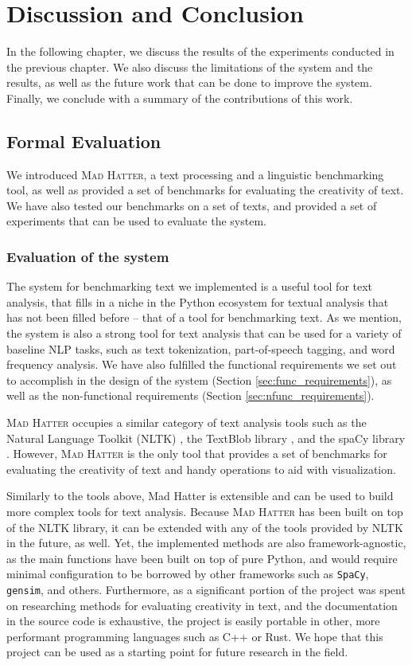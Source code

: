 \chapter{Discussion and Conclusion}
\label{chap:discussion}

In the following chapter, we discuss the results of the experiments conducted in the previous chapter. We also discuss the limitations of the system and the results, as well as the future work that can be done to improve the system. Finally, we conclude with a summary of the contributions of this work. 

\section{Formal Evaluation}
We introduced \textsc{Mad Hatter}, a text processing and a linguistic benchmarking tool, as well as provided a set of benchmarks for evaluating the creativity of text. We have also tested our benchmarks on a set of texts, and provided a set of experiments that can be used to evaluate the system. 

\subsection{Evaluation of the system}
The system for benchmarking text we implemented is a useful tool for text analysis, that fills in a niche in the Python ecosystem for textual analysis that has not been filled before -- that of a tool for benchmarking text. As we mention, the system is also a strong tool for text analysis that can be used for a variety of baseline NLP tasks, such as text tokenization, part-of-speech tagging, and word frequency analysis. We have also fulfilled the functional requirements we set out to accomplish in the design of the system (Section \ref{sec:func_requirements}), as well as the non-functional requirements (Section \ref{sec:nfunc_requirements}).

\textsc{Mad Hatter} occupies a similar category of text analysis tools such as the Natural Language Toolkit (NLTK) \citep{nltk_citation}, the TextBlob library \citep{textblob}, and the spaCy library \citep{spacy2}. However, \textsc{Mad Hatter} is the only tool that provides a set of benchmarks for evaluating the creativity of text and handy operations to aid with visualization. 

Similarly to the tools above, Mad Hatter is extensible and can be used to build more complex tools for text analysis. Because \textsc{Mad Hatter} has been built on top of the NLTK library, it can be extended with any of the tools provided by NLTK in the future, as well. Yet, the implemented methods are also framework-agnostic, as the main functions have been built on top of pure Python, and would require minimal configuration to be borrowed by other frameworks such as \texttt{SpaCy}, \texttt{gensim}, and others. Furthermore, as a significant portion of the project was spent on researching methods for evaluating creativity in text, and the documentation in the source code is exhaustive, the project is easily portable in other, more performant programming languages such as C++ or Rust. We hope that this project can be used as a starting point for future research in the field.


